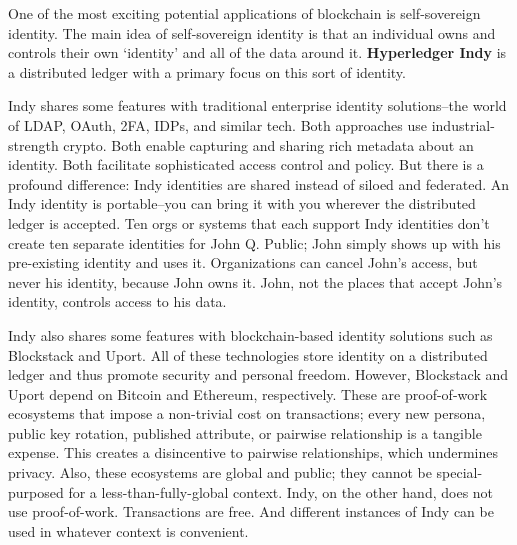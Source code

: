 One of the most exciting potential applications of blockchain is self-sovereign identity.  The main idea of self-sovereign identity is that an individual owns and controls their own `identity' and all of the data around it.  \textbf{Hyperledger Indy} is a distributed ledger with a primary focus on this sort of identity.

Indy shares some features with traditional enterprise identity solutions--the world of LDAP, OAuth, 2FA, IDPs, and similar tech. Both approaches use industrial-strength crypto. Both enable capturing and sharing rich metadata about an identity. Both facilitate sophisticated access control and policy. But there is a profound difference: Indy identities are shared instead of siloed and federated. An Indy identity is portable--you can bring it with you wherever the distributed ledger is accepted. Ten orgs or systems that each support Indy identities don't create ten separate identities for John Q. Public; John simply shows up with his pre-existing identity and uses it. Organizations can cancel John's access, but never his identity, because John owns it. John, not the places that accept John's identity, controls access to his data.

Indy also shares some features with blockchain-based identity solutions such as Blockstack and Uport. All of these technologies store identity on a distributed ledger and thus promote security and personal freedom. However, Blockstack and Uport depend on Bitcoin and Ethereum, respectively. These are proof-of-work ecosystems that impose a non-trivial cost on transactions; every new persona, public key rotation, published attribute, or pairwise relationship is a tangible expense. This creates a disincentive to pairwise relationships, which undermines privacy. Also, these ecosystems are global and public; they cannot be special-purposed for a less-than-fully-global context. Indy, on the other hand, does not use proof-of-work. Transactions are free. And different instances of Indy can be used in whatever context is convenient.

